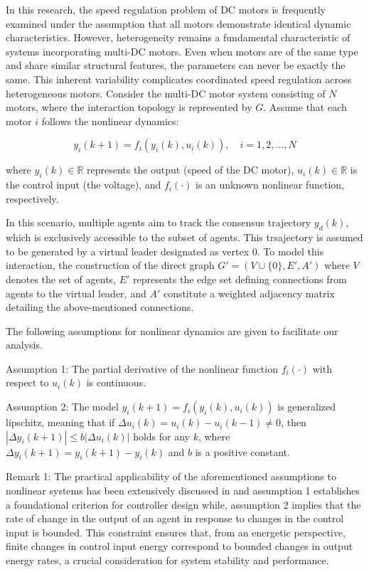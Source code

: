 \documentclass[journal,onecolumn]{IEEEtran}
\begin{document}
In this research, the speed regulation problem of DC motors is frequently examined under the assumption that all motors demonstrate identical dynamic characteristics. However, heterogeneity remains a fundamental characteristic of systems incorporating multi-DC motors. Even when motors are of the same type and share similar structural features, the parameters can never be exactly the same. This inherent variability complicates coordinated speed regulation across heterogeneous motors. Consider the multi-DC motor system consisting of $N$ motors, where the interaction topology is represented by $G$. Assume that each motor $i$ follows the nonlinear dynamics:

\begin{equation}
    \label{model 1}
    y_i(k+1) = f_i(y_i(k), u_i(k)), \quad i = 1, 2, \dots, N
\end{equation}

where $y_i(k) \in \mathbb{R}$ represents the output (speed of the DC motor), $u_i(k) \in \mathbb{R}$ is the control input (the voltage), and $f_i(\cdot)$ is an unknown nonlinear function, respectively.



In this scenario, multiple agents aim to track the consensus trajectory \(y_d(k)\), which is exclusively accessible to the subset of agents. This trsajectory is assumed to be generated by a virtual leader designated as vertex 0. To model this interaction, the construction of the direct graph \( G' = (V \cup \{0\}, E', A') \) where \( V \) denotes the set of agents, \( E' \) represents the edge set defining connections from agents to the virtual leader, and \( A' \) constitute a weighted adjacency matrix detailing the above-mentioned connections.

The following assumptions for nonlinear dynamics are given to facilitate our analysis.

Assumption 1: The partial derivative of the nonlinear function \( f_i(\cdot) \) with respect to \( u_i(k) \) is continuous.

Assumption 2: The model \( y_i(k + 1) = f_i(y_i(k), u_i(k)) \) is generalized lipschitz, meaning that if \( \Delta u_i(k) = u_i(k) - u_i(k - 1) \neq 0 \), then \( | \Delta y_i(k + 1) | \leq b |\Delta u_i(k)| \) holds for any \( k \), where \( \Delta y_i(k + 1) = y_i(k + 1) - y_i(k) \) and \( b \) is a positive constant.

Remark 1: The practical applicability of the aforementioned assumptions to nonlinear systems has been extensively discussed in \cite{1} and assumption 1 establishes a foundational criterion for controller design while, assumption 2 implies that the rate of change in the output of an agent in response to changes in the control input is bounded. This constraint ensures that, from an energetic perspective, finite changes in control input energy correspond to bounded changes in output energy rates, a crucial consideration for system stability and performance.
\end{document}
